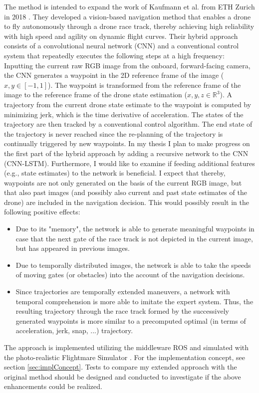 The method is intended to expand the work of Kaufmann et al. from ETH Zurich in 2018 \cite{Kaufmann2018}.
They developed a vision-based navigation method that enables a drone to fly autonomously 
through a drone race track, thereby
achieving high reliability with high speed and agility on dynamic flight curves. 
Their hybrid approach consists of a convolutional neural network (CNN) and a conventional control system that repeatedly executes the following steps at a high frequency:
Inputting the current raw RGB image from the onboard, forward-facing camera, the CNN generates a waypoint in the 2D reference frame of the image ($x, y \in [-1, 1]$).
The waypoint is transformed from the reference frame of the image to the reference frame of the drone state estimation ($x, y, z \in \mathbb R^3$). 
A trajectory from the current drone state estimate to the waypoint is computed by minimizing jerk, which is the time derivative of acceleration.
The states of the trajectory are then tracked by a conventional control algorithm.
The end state of the trajectory is never reached since the re-planning of the trajectory is continually triggered by new waypoints.
In my thesis I plan to make progress on the first part of the hybrid approach 
by adding a recursive network to the CNN (CNN-LSTM).
Furthermore, I would like to examine if feeding additional features (e.g., state estimates) to the network is beneficial.
I expect that thereby, 
waypoints are not only generated on the basis of the current RGB image, 
but that also past images (and possibly also current and past state estimates of the drone) are included in the navigation decision.
This would possibly result in the following positive effects:
\begin{itemize}
	\item Due to its "memory", the network is able to generate meaningful waypoints in case that the next gate of the race track is not depicted in the current image, but has appeared in previous images.
	\item Due to temporally distributed images, the network is able to take the speeds of moving gates (or obstacles) into the account of the navigation decisions.
	\item Since trajectories are temporally extended maneuvers, a network with temporal comprehension is more able to imitate the expert system.
	Thus, the resulting trajectory through the race track formed by the successively generated waypoints is more similar to a precomputed optimal (in terms of acceleration, jerk, snap, ...) trajectory.
\end{itemize}
The approach is implemented utilizing the middleware ROS \cite{ros}
and simulated with the photo-realistic Flightmare Simulator \cite{song2020flightmare}.
For the implementation concept, see section \ref{sec:implConcept}.
Tests to compare my extended approach with the original method should be designed
and conducted to investigate if the above enhancements could be realized.



